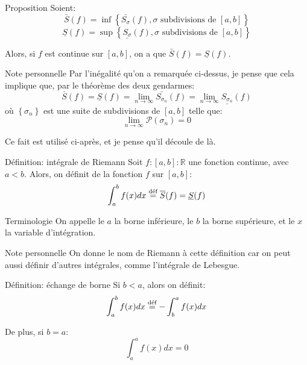 \documentclass[a4paper]{article}
\begin{document}
\begin{parag}{Proposition}
    Soient:
    \[\bar{S}\left(f\right) = \inf\left\{\bar{S_{\sigma}}\left(f\right), \sigma \text{ subdivisions de } \left[a, b\right]\right\}\]
    \[\underline{S}\left(f\right) = \sup\left\{\underline{S_{\sigma}}\left(f\right), \sigma \text{ subdivisions de } \left[a, b\right]\right\}\]

    Alors, si $f$ est continue sur $\left[a, b\right]$, on a que $\bar{S}\left(f\right) = \underline{S}\left(f\right)$.

    \begin{subparag}{Note personnelle}
        Par l'inégalité qu'on a remarquée ci-dessus, je pense que cela implique que, par le théorème des deux gendarmes:
        \[\bar{S}\left(f\right) = \underline{S}\left(f\right) = \lim_{n \to \infty} \bar{S_{\sigma_n}}\left(f\right) = \lim_{n \to \infty} \underline{S_{\sigma_n}}\left(f\right)\]
        où $\left\{\sigma_n\right\}$ est une suite de subdivisions de $\left[a, b\right]$ telle que:
        \[\lim_{n \to \infty} \mathcal{P}\left(\sigma_n\right) = 0\]

        Ce fait est utilisé ci-après, et je pense qu'il découle de là.
    \end{subparag}
    
\end{parag}

\begin{parag}{Définition: intégrale de Riemann}
    Soit $f : \left[a, b\right] : \mathbb{R}$ une fonction continue, avec $a < b$. Alors, on définit  de la fonction $f$ sur $\left[a, b\right]$:
    \[\int_{a}^{b} f\left(x\right)dx \over{=}{déf} \bar{S}\left(f\right) = \underline{S}\left(f\right)\]
    
    \begin{subparag}{Terminologie}
        On appelle le $a$ la borne inférieure, le $b$ la borne supérieure, et le $x$ la variable d'intégration.
    \end{subparag}

    \begin{subparag}{Note personnelle}
        On donne le nom de Riemann à cette définition car on peut aussi définir d'autres intégrales, comme l'intégrale de Lebesgue.
    \end{subparag}
    
\end{parag}

\begin{parag}{Définition: échange de borne}
    Si $b < a$, alors on définit: 
    \[\int_{a}^{b} f\left(x\right)dx \over{=}{déf} -\int_{b}^{a} f\left(x\right)dx\]
    
    De plus, si $b = a$: 
    \[\int_{a}^{a} f\left(x\right)dx = 0\]
\end{parag}
\end{document}
